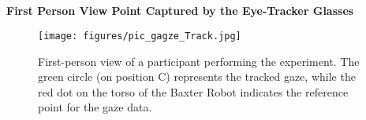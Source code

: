\documentclass[10pt]{article}
\begin{document}
\subsection*{}
\textbf{First Person View Point Captured by the Eye-Tracker Glasses}
\begin{figure}[H]
    \centering
    \texttt{[image: figures/pic\_gagze\_Track.jpg]}
    \caption{First-person view of a participant performing the experiment. The green circle (on position C) represents the tracked gaze, while the red dot on the torso of the Baxter Robot indicates the reference point for the gaze data.}
    \label{fig:gaze_tracking_POV}
\end{figure}
\end{document}

